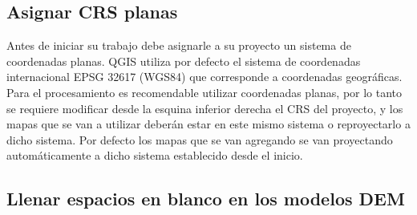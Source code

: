 \documentclass[a4paper,oneside,11pt,]{article}
\begin{document}
\subsection{Asignar CRS planas}

Antes de iniciar su trabajo debe asignarle a su proyecto un sistema de coordenadas planas. QGIS utiliza por defecto el sistema de coordenadas internacional EPSG 32617 (WGS84) que corresponde a coordenadas geográficas. Para el procesamiento es recomendable utilizar coordenadas planas, por lo tanto se requiere modificar desde la esquina inferior derecha el CRS del proyecto, y los mapas que se van a utilizar deberán estar en este mismo sistema o reproyectarlo a dicho sistema. Por defecto los mapas que se van agregando se van proyectando automáticamente a dicho sistema establecido desde el inicio.

\subsection{Llenar espacios en blanco en los modelos DEM}
\end{document}
